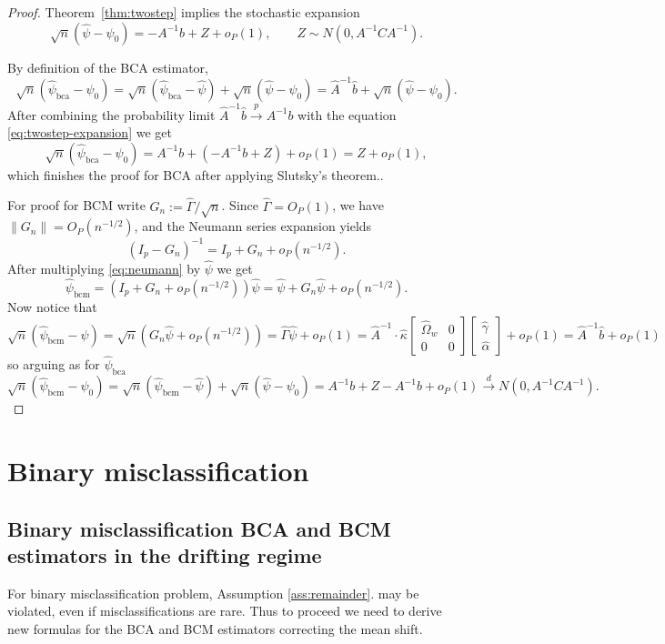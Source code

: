 \documentclass[11pt]{article}
\theoremstyle{definition}
\theoremstyle{remark}
\newcommand{\toP}{\xrightarrow{\,p\,}}
\newcommand{\tod}{\xrightarrow{\,d\,}}
\begin{document}
\begin{proof}
Theorem~\ref{thm:twostep} implies the stochastic expansion
\begin{equation}
\sqrt{n}(\hat\psi-\psi_0)= -A^{-1}b + Z + o_P(1),
\qquad Z\sim N(0,A^{-1}CA^{-1}).
\label{eq:twostep-expansion}
\end{equation}

By definition of the BCA estimator,
\[
\sqrt{n}(\hat\psi_{\mathrm{bca}}-\psi_0)=\sqrt n (\hat\psi_{\mathrm{bca}}-\hat\psi) + \sqrt n (\hat \psi - \psi_0) = \hat A^{-1}\hat b + \sqrt{n}(\hat\psi-\psi_0).
\]
After combining the probability limit $\hat A^{-1}\hat b\toP A^{-1}b$ with the equation \eqref{eq:twostep-expansion} we get
\[
\sqrt{n}(\hat\psi_{\mathrm{bca}}-\psi_0) = A^{-1}b + (-A^{-1}b+Z)+o_P(1)=Z+o_P(1),
\]
which finishes the proof for BCA after applying Slutsky's theorem..

For proof for BCM write $G_n:=\hat\Gamma/\sqrt{n}$. Since $\hat\Gamma=O_P(1)$, we have $\|G_n\|=O_P(n^{-1/2})$, and the Neumann series expansion yields
\begin{equation}
(I_p-G_n)^{-1}=I_p+G_n+o_P(n^{-1/2}).
\label{eq:neumann}
\end{equation}
After multiplying \eqref{eq:neumann} by $\hat\psi$ we get
\[
\hat\psi_{\mathrm{bcm}}=(I_p+G_n+o_P(n^{-1/2}))\hat\psi
=\hat\psi+G_n\hat\psi+o_P(n^{-1/2}).
\]
Now notice that
\[ \sqrt n (\hat\psi_{\mathrm{bcm}} - \hat \psi) = \sqrt n (G_n\hat\psi + o_P(n^{-1/2})) = \hat\Gamma \hat\psi +o_P(1) = \hat A^{-1} \cdot \hat\kappa \begin{bmatrix} \hat\Omega_w & 0 \\ 0 & 0 \end{bmatrix} \begin{bmatrix} \hat\gamma \\ \hat\alpha\end{bmatrix} +o_P(1) = \hat A^{-1} \hat b +o_P(1) \]
so arguing as for $\hat\psi_{\mathrm{bca}}$
\[ \sqrt n (\hat\psi_{\mathrm{bcm}} - \psi_0) = \sqrt n (\hat\psi_{\mathrm{bcm}}-\hat\psi ) + \sqrt n (\hat\psi - \psi_0) = A^{-1}b + Z - A^{-1}b +o_P(1) \tod N(0, A^{-1}CA^{-1}). \]
\end{proof}

\section{Binary misclassification}
\subsection{Binary misclassification BCA and BCM estimators in the drifting regime}
For binary misclassification problem, Assumption \ref{ass:remainder}. may be violated, even if misclassifications are rare. Thus to proceed we need to derive new formulas for the BCA and BCM estimators correcting the mean shift.
\end{document}
